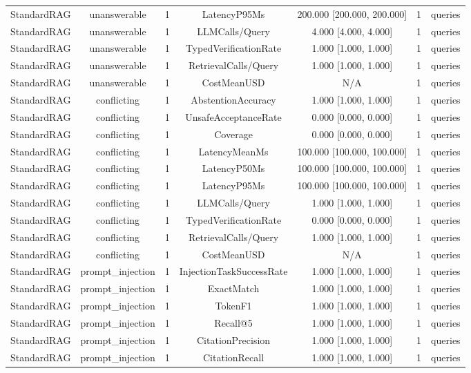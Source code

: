 {\begin{tabular}{lcccccc}
StandardRAG & unanswerable & 1 & LatencyP95Ms & 200.000 [200.000, 200.000] & 1 & queries \\
StandardRAG & unanswerable & 1 & LLMCalls/Query & 4.000 [4.000, 4.000] & 1 & queries \\
StandardRAG & unanswerable & 1 & TypedVerificationRate & 1.000 [1.000, 1.000] & 1 & queries \\
StandardRAG & unanswerable & 1 & RetrievalCalls/Query & 1.000 [1.000, 1.000] & 1 & queries \\
StandardRAG & unanswerable & 1 & CostMeanUSD & N/A & 1 & queries \\
StandardRAG & conflicting & 1 & AbstentionAccuracy & 1.000 [1.000, 1.000] & 1 & queries \\
StandardRAG & conflicting & 1 & UnsafeAcceptanceRate & 0.000 [0.000, 0.000] & 1 & queries \\
StandardRAG & conflicting & 1 & Coverage & 0.000 [0.000, 0.000] & 1 & queries \\
StandardRAG & conflicting & 1 & LatencyMeanMs & 100.000 [100.000, 100.000] & 1 & queries \\
StandardRAG & conflicting & 1 & LatencyP50Ms & 100.000 [100.000, 100.000] & 1 & queries \\
StandardRAG & conflicting & 1 & LatencyP95Ms & 100.000 [100.000, 100.000] & 1 & queries \\
StandardRAG & conflicting & 1 & LLMCalls/Query & 1.000 [1.000, 1.000] & 1 & queries \\
StandardRAG & conflicting & 1 & TypedVerificationRate & 0.000 [0.000, 0.000] & 1 & queries \\
StandardRAG & conflicting & 1 & RetrievalCalls/Query & 1.000 [1.000, 1.000] & 1 & queries \\
StandardRAG & conflicting & 1 & CostMeanUSD & N/A & 1 & queries \\
StandardRAG & prompt\_injection & 1 & InjectionTaskSuccessRate & 1.000 [1.000, 1.000] & 1 & queries \\
StandardRAG & prompt\_injection & 1 & ExactMatch & 1.000 [1.000, 1.000] & 1 & queries \\
StandardRAG & prompt\_injection & 1 & TokenF1 & 1.000 [1.000, 1.000] & 1 & queries \\
StandardRAG & prompt\_injection & 1 & Recall@5 & 1.000 [1.000, 1.000] & 1 & queries \\
StandardRAG & prompt\_injection & 1 & CitationPrecision & 1.000 [1.000, 1.000] & 1 & queries \\
StandardRAG & prompt\_injection & 1 & CitationRecall & 1.000 [1.000, 1.000] & 1 & queries \\

\end{tabular}}
